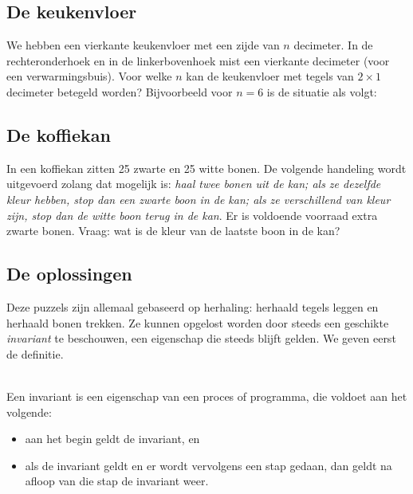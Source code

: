 \subsection*{De keukenvloer}
We hebben een vierkante keukenvloer met een zijde van $n$ decimeter. In de rechteronderhoek en in de linkerbovenhoek mist een vierkante decimeter (voor een verwarmingsbuis). Voor welke $n$ kan de keukenvloer met tegels van $2\times 1$ decimeter betegeld worden? Bijvoorbeeld voor $n=6$ is de situatie als volgt:
\begin{center}
\end{center}

\subsection*{De koffiekan}
In een koffiekan zitten 25 zwarte en 25 witte bonen. De volgende handeling wordt uitgevoerd zolang dat mogelijk is: \textit{haal twee bonen uit de kan; als ze dezelfde kleur hebben, stop dan een zwarte boon in de kan; als ze verschillend van kleur zijn, stop dan de witte boon terug in de kan}. Er is voldoende voorraad extra zwarte bonen. Vraag: wat is de kleur van de laatste boon in de kan?

\subsection*{De oplossingen}
Deze puzzels zijn allemaal gebaseerd op herhaling: herhaald tegels leggen en herhaald bonen trekken. Ze kunnen opgelost worden door steeds een geschikte \textit{invariant} te beschouwen, een eigenschap die steeds blijft gelden. We geven eerst de definitie.

\begin{definition}[Invariant]\mbox{}\\
Een invariant is een eigenschap van een proces of programma, die voldoet aan het volgende:
\begin{itemize}
    \item aan het begin geldt de invariant, en
    \item als de invariant geldt en er wordt vervolgens een stap gedaan, dan geldt na afloop van die stap de invariant weer.
\end{itemize}
\end{definition}

